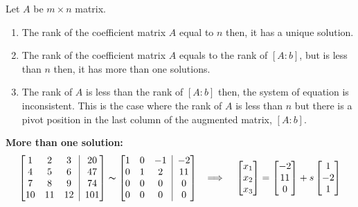 \documentclass[math101_lecturenotes_ku.tex]{subfiles}
\begin{document}
Let \(A\) be \(m \times n\) matrix.
\begin{enumerate}
  \item The rank of the coefficient matrix \(A\) equal to \(n\) then, it has a unique solution.
  \item The rank of the coefficient matrix \(A\) equals to the rank of \([A:b]\), but is less than \(n\) then, it has more than one solutions.
\item The rank of \(A\) is less than the rank of \([A:b]\) then, the system of equation is inconsistent. This is the case where the rank of \(A\) is less than \(n\) but there is a pivot position in the last column of the augmented matrix, \([A:b]\).
\end{enumerate}
\textbf{More than one solution:}
$$ \left[ \begin{matrix}
    1 & 2 & 3 \\
    4 & 5 & 6 \\
    7 & 8 & 9 \\
    10 & 11 & 12
\end{matrix} \;\; \vline \;\;
\begin{matrix}
    20\\ 47\\ 74\\ 101
\end{matrix} \right] \thicksim  \left[ \begin{matrix}
    1 & 0 & -1 \\
    0 & 1 & 2 \\
    0 & 0 & 0 \\
    0 & 0 & 0
\end{matrix} \;\; \vline \;\;
\begin{matrix}
    -2\\ 11\\ 0\\ 0
\end{matrix} \right]  \;\;\; \Longrightarrow \hspace{4mm}\begin{bmatrix}
    x_1\\ x_2 \\ x_3
\end{bmatrix} = \begin{bmatrix}
    -2\\ 11 \\0
\end{bmatrix}+ s \begin{bmatrix}
    1\\ -2 \\1
  \end{bmatrix}$$ \vspace{3mm}
\end{document}
